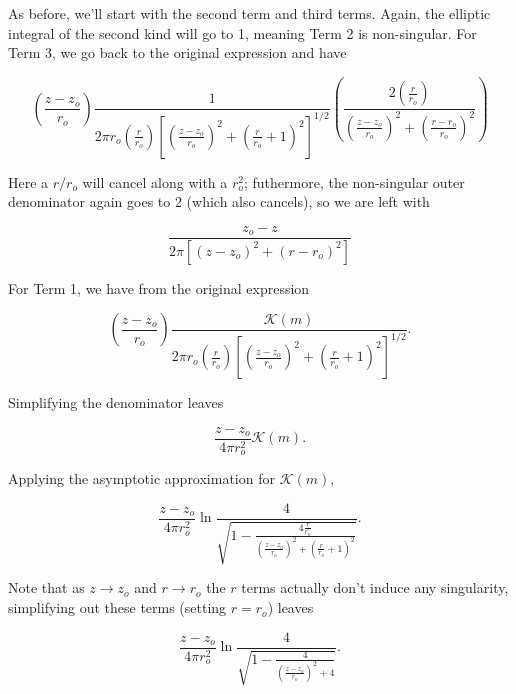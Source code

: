 \noindent As before, we'll start with the second term and third terms.
%
Again, the elliptic integral of the second kind will go to 1, meaning Term 2 is non-singular.
%
For Term 3, we go back to the original expression and have

\begin{equation}
\left(\frac{z-z_o}{r_o}\right) \frac{1}{2\pi r_o \left(\frac{r}{r_o}\right) \left[\left(\frac{z-z_o}{r_o}\right)^2 + \left(\frac{r}{r_o}+1\right)^2 \right]^{1/2}}
%
\left(\frac{2 \left(\frac{r}{r_o}\right)}{\left(\frac{z-z_o}{r_o}\right)^2 + \left(\frac{r-r_o}{r_o}\right)^2}\right)
\end{equation}

\noindent Here a $r/r_o$ will cancel along with a $r_o^2$; futhermore, the non-singular outer denominator again goes to 2 (which also cancels), so we are left with

\begin{equation}
    \label{eqn:sepsingvrt3}
    \frac{z_o-z}{2\pi\left[\left(z-z_o\right)^2 + \left(r-r_o\right)^2\right]}
\end{equation}

For Term 1, we have from the original expression

\begin{equation}
    \left(\frac{z-z_o}{r_o}\right) \frac{\mathcal{K}(m)}
    {2\pi r_o \left(\frac{r}{r_o}\right) \left[\left(\frac{z-z_o}{r_o}\right)^2 + \left(\frac{r}{r_o}+1\right)^2 \right]^{1/2}}.
\end{equation}

\noindent Simplifying the denominator leaves

\begin{equation}
    \frac{z-z_o}{4\pi r_o^2}\mathcal{K}(m).
\end{equation}

\noindent Applying the asymptotic approximation for \(\mathcal{K}(m)\),

\begin{equation}
\frac{z-z_o}{4\pi r_o^2}\ln \frac{4}{\sqrt{1-\frac{4\frac{r}{r_o}}{\left(\frac{z-z_o}{r_o}\right)^2 + \left(\frac{r}{r_o}+1\right)^2}}}.
\end{equation}

\noindent Note that as \(z \rightarrow z_o\) and \(r\rightarrow r_o\) the \(r\) terms actually don't induce any singularity, simplifying out these terms (setting \(r=r_o\)) leaves

\begin{equation}
\frac{z-z_o}{4\pi r_o^2}\ln \frac{4}{\sqrt{1-\frac{4}{\left(\frac{z-z_o}{r_o}\right)^2 + 4}}}.
\end{equation}

